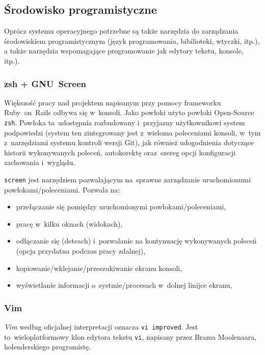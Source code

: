 \subsection{Środowisko programistyczne}

Oprócz systemu operacyjnego potrzebne są także narzędzia do zarządzania środowiskiem programistycznym (język programowania, bibilioteki, wtyczki, itp.), a także narzędzia wspomagające programowanie jak edytory tekstu, konsole, itp.).

\subsubsection{zsh + GNU~Screen}

Większość pracy nad projektem napisanym przy pomocy frameworku Ruby~on~Rails odbywa się w~konsoli. Jako powłoki użyto powłoki Open-Source \texttt{zsh}\cite{zsh}. Powłoka ta~udostępnia rozbudowany i~przyjazny użytkownikowi system podpowiedzi (system ten zintegrowany jest z~wieloma poleceniami konsoli, w~tym z~narzędziami systemu kontroli wersji Git), jak również udogodnienia dotyczące historii wykonywanych poleceń, autokorektę oraz~szereg opcji konfiguracji zachowania i~wyglądu.


\texttt{screen}\cite{screen} jest narzędziem pozwalającym na~sprawne zarządzanie uruchomionumi powłokami/poleceniami. Pozwala na:

\begin{itemize}
  \item przełączanie się pomiędzy uruchomionymi powłokami/poleceniami,
  \item pracę w~kilku oknach (widokach),
  \item odłączanie się (deteach) i~pozwalanie na kontynuację wykonywanych poleceń (opcja przydatna podczas pracy zdalnej),
  \item kopiowanie/wklejanie/przeszukiwanie ekranu konsoli,
  \item wyświetlanie informacji o~systmie/procesach w~dolnej linijce ekranu,
\end{itemize}

\subsubsection{Vim}

\textit{Vim}\cite{vim} według oficjalnej interpretacji oznacza \texttt{vi improved}. Jest to~wieloplatformowy klon edytora tekstu \texttt{vi}, napisany przez Brama Moolenaara, holenderskiego programistę.

